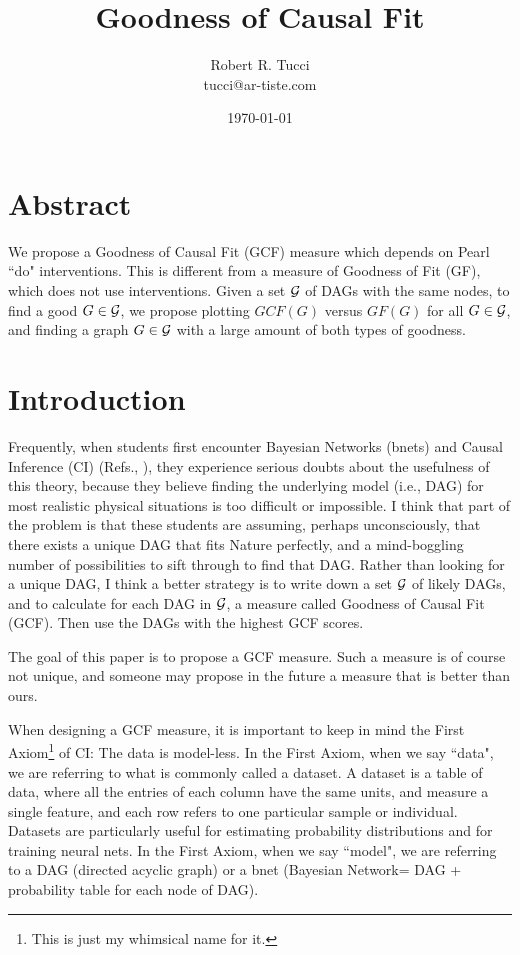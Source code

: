 \documentclass[12pt]{article}
\begin{document}
\title{Goodness of Causal Fit}
\date{ \today}
\author{Robert R. Tucci\\
        tucci@ar-tiste.com}
\maketitle
\vskip2cm
\section*{Abstract}
We propose a 
Goodness of Causal Fit (GCF) measure
which depends 
on Pearl ``do" interventions.
This is different
from a measure of Goodness of Fit (GF),
which does not use interventions.
Given a set ${\cal G}$
of DAGs with the same nodes,
to find a good $G\in {\cal G}$,
we propose plotting
$GCF(G)$ versus $GF(G)$
for all $G\in {\cal G}$,
and finding a 
graph $G\in {\cal G}$  with 
a large amount 
of both types of goodness.


\newpage
\section{Introduction}



Frequently,
when students
first encounter
Bayesian Networks (bnets)
and Causal Inference (CI)
(Refs.\cite{pearl-2013book},
\cite{bayesuvius}),
they experience serious doubts
about the usefulness of this
theory, because they believe
finding the underlying model 
(i.e., DAG)
for most realistic
 physical situations is
too difficult or impossible.
I think
that part of the problem
is that these students
are assuming, perhaps
unconsciously,
that there exists
a unique DAG
that fits Nature perfectly,
and a mind-boggling number
 of possibilities
to sift through to find that DAG.
Rather than looking
for a unique DAG,
I think a better strategy
is to write down
a set ${\cal G}$ 
of likely DAGs,
and to calculate for 
each DAG in ${\cal G}$,
 a measure called 
Goodness of Causal Fit (GCF).
Then use the DAGs with
the highest GCF scores.


The goal of this paper
is to propose a GCF measure.
Such a measure is of course
not unique,
and someone may propose 
in the future a measure that is better
than ours.

When designing a GCF measure,
it is important to keep
in mind the First Axiom\footnote{
This is just my whimsical name for it.} of CI: The data is model-less.
 In the First Axiom,
when we say ``data", we are referring to what is commonly
 called a dataset. A dataset is a table of data, where all
 the entries of each column have the same units, and 
measure a single feature, and each row refers to one
 particular sample or individual. Datasets are particularly 
useful for estimating probability distributions and for 
training neural nets. In the First Axiom, when we say ``model", we are 
referring to a DAG (directed acyclic graph) or a bnet
 (Bayesian Network= DAG + probability table 
for each node of DAG).
\end{document}
